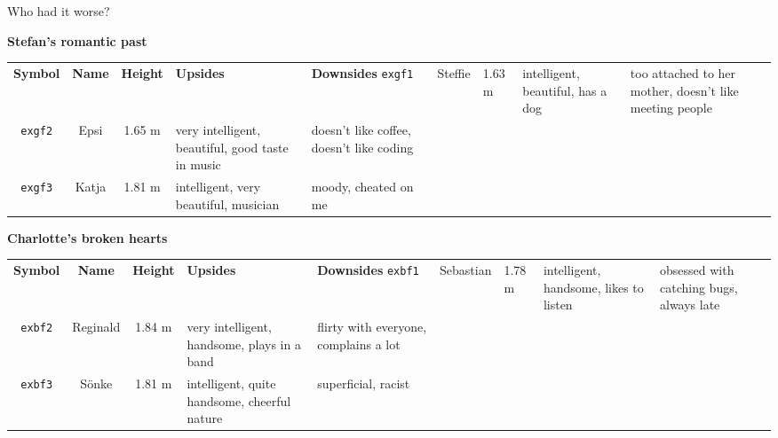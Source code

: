 \begin{frame}{Who had it worse?}
%
\begin{center}
\scriptsize
\textbf{Stefan's romantic past}
\begin{tabular}{c|ccp{.3\linewidth}p{.3\linewidth}}
	\textbf{Symbol} & \textbf{Name} & \textbf{Height} & \textbf{Upsides}                                 & \textbf{Downsides} \tabcrlf
	\texttt{exgf1}  & Steffie       & 1.63 m          & intelligent, beautiful, has a dog                & too attached to her mother, 
																																																				doesn't like meeting people \\
	\texttt{exgf2}  & Epsi          & 1.65 m          & very intelligent, beautiful, good taste in music & doesn't like coffee, doesn't like coding \\
	\texttt{exgf3}  & Katja         & 1.81 m          & intelligent, very beautiful, musician            & moody, cheated on me
\end{tabular}
\end{center}

\begin{center}
\scriptsize
\textbf{Charlotte's broken hearts}
\begin{tabular}{c|ccp{.3\linewidth}p{.3\linewidth}}
	\textbf{Symbol} & \textbf{Name} & \textbf{Height} & \textbf{Upsides}                                 & \textbf{Downsides} \tabcrlf
	\texttt{exbf1}  & Sebastian     & 1.78 m          & intelligent, handsome, likes to listen           & obsessed with catching bugs, always late \\
	\texttt{exbf2}  & Reginald      & 1.84 m          & very intelligent, handsome, plays in a band      & flirty with everyone, complains a lot \\
	\texttt{exbf3}  & Sönke         & 1.81 m          & intelligent, quite handsome, cheerful nature     & superficial, racist
\end{tabular}
\end{center}
%
\end{frame}


